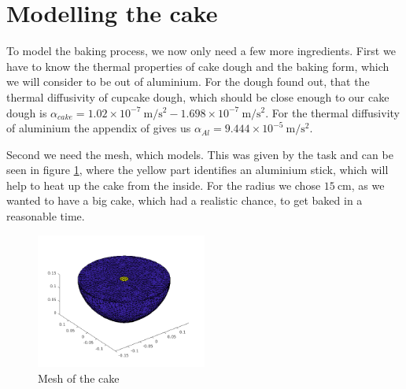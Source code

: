 
\section{\label{sec::modelling}Modelling the cake}
To model the baking process, we now only need a few more ingredients. First we have to know the thermal properties of cake dough and the baking form, which we will consider to be out of aluminium. For the dough \cite{baik1999modeling} found out, that the thermal diffusivity of cupcake dough, which should be close enough to our cake dough is $\alpha_{cake} =  1.02\times 10^{-7} \SI{}{\meter/\second^2} - 1.698\times 10^{-7} \SI{}{\meter/\second^2}$. For the thermal diffusivity of aluminium the appendix of \cite{kothandaraman2006fundamentals} gives us $\alpha_{Al} = 9.444\times 10^{-5} \SI{}{\meter/\second^2}$.

Second we need the mesh, which models. This was given by the task and can be seen in figure \ref{fig::mesh}, where the yellow part identifies an aluminium stick, which will help to heat up the cake from the inside. For the radius we chose $15\SI{}{\centi\meter}$, as we wanted to have a big cake, which had a realistic chance, to get baked in a reasonable time.

\begin{figure}[htp]
	\centering
	\includegraphics[width=0.5\textwidth]{figures/mesh.png}
	\caption{\label{fig::mesh} Mesh of the cake}
\end{figure}